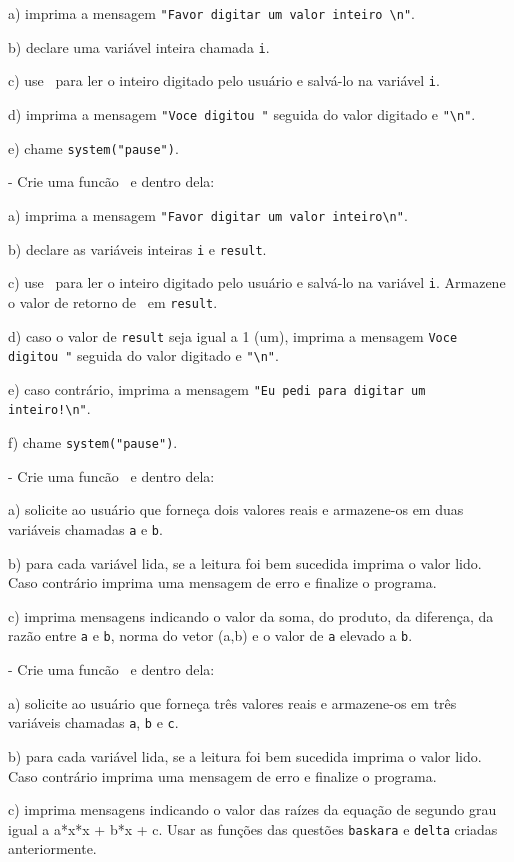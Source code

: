 a) imprima a mensagem \verb|"Favor digitar um valor inteiro \n"|.

b) declare uma variável inteira chamada {\tt i}.

c) use \SCANF\ para ler o inteiro digitado pelo usuário e salvá-lo na variável {\tt i}.

d) imprima a mensagem \verb|"Voce digitou "| seguida do valor digitado e \verb|"\n"|.

e) chame \verb|system("pause")|.

\NEWLINE
\quest - Crie uma funcão \MAIN\ e dentro dela:

a) imprima a mensagem \verb|"Favor digitar um valor inteiro\n"|.

b) declare as variáveis inteiras {\tt i} e {\tt result}.

c) use \SCANF\ para ler o inteiro digitado pelo usuário e salvá-lo na variável {\tt i}. Armazene o valor de retorno de \SCANF\ em {\tt result}.

d) caso o valor de {\tt result} seja igual a 1 (um), imprima a mensagem \verb|Voce digitou "| seguida do valor digitado e \verb|"\n"|.

e) caso contrário, imprima a mensagem \verb|"Eu pedi para digitar um inteiro!\n"|.

f) chame \verb|system("pause")|.

\NEWLINE
\quest - Crie uma funcão \MAIN\ e dentro dela:

a) solicite ao usuário que forneça dois valores reais e armazene-os em duas variáveis chamadas {\tt a} e {\tt b}.

b) para cada variável lida, se a leitura foi bem sucedida imprima o valor lido. Caso contrário imprima uma mensagem de erro e finalize o programa.

c) imprima mensagens indicando o valor da soma, do produto, da diferença, da razão entre {\tt a} e {\tt b}, norma do vetor (a,b) e o valor de {\tt a} elevado a {\tt b}.

\NEWLINE
\quest - Crie uma funcão \MAIN\ e dentro dela:

a) solicite ao usuário que forneça três valores reais e armazene-os em três variáveis chamadas {\tt a}, {\tt b} e {\tt c}.

b) para cada variável lida, se a leitura foi bem sucedida imprima o valor lido. Caso contrário imprima uma mensagem de erro e finalize o programa.

c) imprima mensagens indicando o valor das raízes da equação de segundo grau igual a a*x*x + b*x + c. Usar as funções das questões {\tt baskara} e {\tt delta} criadas anteriormente.


